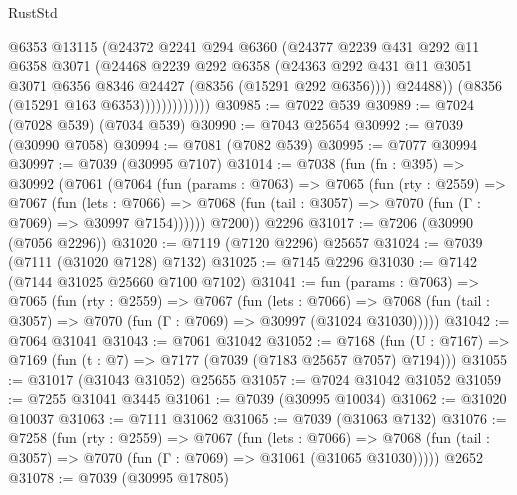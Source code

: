 \begin{lexlean}{RustStd}
\begin{coremodule}
                          @6353
                          @13115
                          (@24372
                            @2241
                            @294
                            @6360
                            (@24377
                              @2239
                              @431
                              @292
                              @11
                              @6358
                              @3071
                              (@24468
                                @2239
                                @292
                                @6358
                                (@24363
                                  @292
                                  @431
                                  @11
                                  @3051
                                  @3071
                                  @6356
                                  @8346
                                  @24427
                                  (@8356 (@15291 @292 @6356))))
                              @24488))
                          (@8356 (@15291 @163 @6353)))))))))))))
@30985 := @7022 @539
@30989 := @7024 (@7028 @539) (@7034 @539)
@30990 := @7043 @25654
@30992 := @7039 (@30990 @7058)
@30994 := @7081 (@7082 @539)
@30995 := @7077 @30994
@30997 := @7039 (@30995 @7107)
@31014 := @7038
    (fun (fn : @395) =>
    @30992
      (@7061
        (@7064
          (fun (params : @7063) =>
          @7065
            (fun (rty : @2559) =>
            @7067
              (fun (lets : @7066) =>
              @7068 (fun (tail : @3057) => @7070 (fun (Γ : @7069) => @30997 @7154))))))
        @7200))
    @2296
@31017 := @7206 (@30990 (@7056 @2296))
@31020 := @7119 (@7120 @2296) @25657
@31024 := @7039 (@7111 (@31020 @7128) @7132)
@31025 := @7145 @2296
@31030 := @7142 (@7144 @31025 @25660 @7100 @7102)
@31041 := fun (params : @7063) =>
  @7065
    (fun (rty : @2559) =>
    @7067
      (fun (lets : @7066) =>
      @7068 (fun (tail : @3057) => @7070 (fun (Γ : @7069) => @30997 (@31024 @31030)))))
@31042 := @7064 @31041
@31043 := @7061 @31042
@31052 := @7168
    (fun (U : @7167) => @7169 (fun (t : @7) => @7177 (@7039 (@7183 @25657 @7057) @7194)))
@31055 := @31017 (@31043 @31052) @25655
@31057 := @7024 @31042 @31052
@31059 := @7255 @31041 @3445
@31061 := @7039 (@30995 @10034)
@31062 := @31020 @10037
@31063 := @7111 @31062
@31065 := @7039 (@31063 @7132)
@31076 := @7258
    (fun (rty : @2559) =>
    @7067
      (fun (lets : @7066) =>
      @7068 (fun (tail : @3057) => @7070 (fun (Γ : @7069) => @31061 (@31065 @31030)))))
    @2652
@31078 := @7039 (@30995 @17805)

\end{coremodule}
\end{lexlean}
